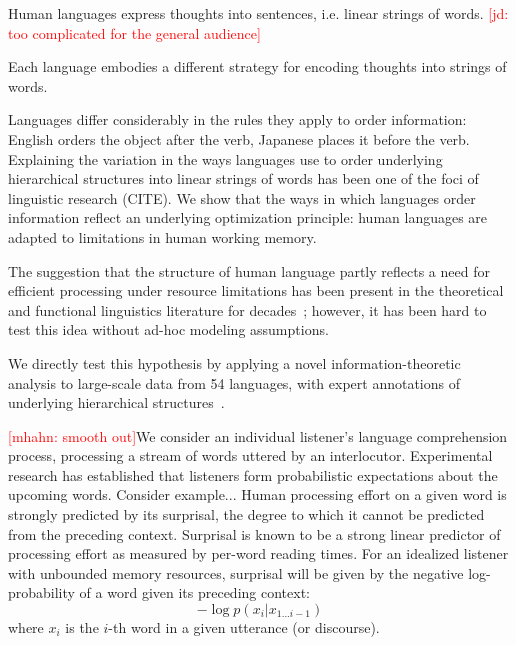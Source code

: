 \documentclass[11pt,letterpaper]{article}
\newcommand{\jd}[1]{\textcolor{Red}{[jd: #1]}}
\newcommand{\mhahn}[1]{\textcolor{Red}{[mhahn: #1]}}
\begin{document}

Human languages express thoughts into sentences, i.e. linear strings of words. \jd{too complicated for the general audience}

Each language embodies a different strategy for encoding thoughts into strings of words. 

Languages differ considerably in the rules they apply to order information: English orders the object after the verb, Japanese places it before the verb.
Explaining the variation in the ways languages use to order underlying hierarchical structures into linear strings of words has been one of the foci of linguistic research (CITE).
We show that the ways in which languages order information reflect an underlying optimization principle: human languages are adapted to limitations in human working memory.

The suggestion that the structure of human language partly reflects a need for efficient processing under resource limitations has been present in the theoretical and functional linguistics literature for decades~\citep{berwick1984grammatical,hawkins1994performance};
however, it has been hard to test this idea without ad-hoc modeling assumptions.

We directly test this hypothesis by applying a novel information-theoretic analysis to large-scale data from 54 languages, with expert annotations of underlying hierarchical structures~\citep{nivre-universal-2017}.


\mhahn{smooth out}We consider an individual listener's language comprehension process, processing a stream of words uttered by an interlocutor.
Experimental research has established that listeners form probabilistic expectations about the upcoming words.
Consider example...
Human processing effort on a given word is strongly predicted by its surprisal, the degree to which it cannot be predicted from the preceding context.
Surprisal is known to be a strong linear predictor of processing effort as measured by per-word reading times.
For an idealized listener with unbounded memory resources, surprisal will be given by the negative log-probability of a word given its preceding context:
\begin{equation}\label{eq:surp}
	-\log p(x_i|x_{1...i-1})
\end{equation}
where $x_i$ is the $i$-th word in a given utterance (or discourse).
\end{document}
